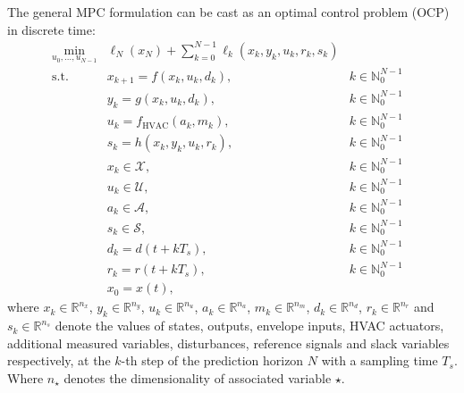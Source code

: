 \documentclass[10pt]{article}
\begin{document}
The general MPC formulation can be cast as an optimal control problem (OCP) in discrete time:
\begin{subequations}
	\label{eq:mpc_general_formal}
	\begin{align}
	\min_{u_0, \ldots, u_{N-1}} & \ell_N(x_N) + \sum_{k=0}^{N-1} \ell_k(x_k, y_k, u_k, r_k, s_k) &
	\label{eq:mpc_general_formal:cost}\\
	\text{s.t.} \ & x_{k+1} = f(x_k, u_k, d_k),  & k \in \mathbb{N}_{0}^{N-1} & \label{eq:mpc_general_formal:xp} \\
	& y_{k} = g(x_k, u_k, d_k),  & k \in \mathbb{N}_{0}^{N-1} & \label{eq:mpc_general_formal:yp} \\
    &  u_{k} = f_{\text{HVAC}}(a_k,m_k),  & k \in \mathbb{N}_{0}^{N-1} & \label{eq:mpc_general_formal:u} \\
	& s_{k} = h(x_k, y_k, u_k, r_k),  & k \in \mathbb{N}_{0}^{N-1} & \label{eq:mpc_general_formal:s} \\
	&  x_{k} \in \mathcal{X},  & k \in \mathbb{N}_{0}^{N-1}   \label{eq:mpc_general_formal:xb}\\
	& u_{k} \in \mathcal{U}, & k \in \mathbb{N}_{0}^{N-1} 
	\label{eq:mpc_general_formal:ub}\\
    & a_{k} \in \mathcal{A}, & k \in \mathbb{N}_{0}^{N-1} 
	\label{eq:mpc_general_formal:ab}\\
	& s_{k} \in \mathcal{S}, & k \in \mathbb{N}_{0}^{N-1} 
	\label{eq:mpc_general_formal:sb}\\
    & d_k = d(t + k T_s),  & k \in \mathbb{N}_{0}^{N-1} \label{eq:mpc_general_formal:d0} \\
    & r_k = r(t + k T_s),  & k \in \mathbb{N}_{0}^{N-1} \label{eq:mpc_general_formal:r0} \\
	& x_0 = x(t),\label{eq:mpc_general_formal:x0} 
	\end{align}
\end{subequations}
where $x_k \in \mathbb{R}^{n_x}$, $y_k \in \mathbb{R}^{n_y}$, $u_k \in \mathbb{R}^{n_u}$, $a_k \in \mathbb{R}^{n_a}$,
$m_k \in \mathbb{R}^{n_m}$, $d_k \in \mathbb{R}^{n_d}$, $r_k \in \mathbb{R}^{n_r}$ and $s_k \in \mathbb{R}^{n_s}$ denote the values of states, outputs, envelope inputs, HVAC actuators, additional measured variables, disturbances, reference signals and slack variables respectively, at the $k$-th step of the prediction horizon $N$ with a sampling time $T_s$. 
Where $n_{\star}$ denotes the dimensionality of associated variable $\star$.
\end{document}
